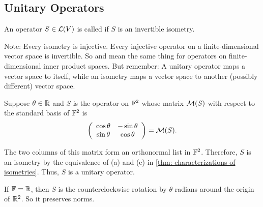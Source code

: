 \subsection{Unitary Operators}

\begin{mydef}
  An operator $S \in \mathcal{L} (V)$ is called  if $S$ is an invertible isometry.
\end{mydef}

Note: Every isometry is injective. Every injective operator on a finite-dimensional vector space is invertible. So  and  mean the same thing for operators on finite-dimensional inner product spaces. But remember: A unitary operator maps a vector space to itself, while an isometry maps a vector space to another (possibly different) vector space.

\begin{example}
  Suppose $\theta \in \mathbb{R}$ and $S$ is the operator on $\mathbb{F}^2$ whose matrix $\mathcal{M}(S)$ with respect to the standard basis of $\mathbb{F}^2$ is
  \[
    \left(\begin{array}{cc}
      \cos \theta & - \sin \theta \\
      \sin \theta & \cos \theta
    \end{array} \right)
    = \mathcal{M}(S).
  \]

  The two columns of this matrix form an orthonormal list in $\mathbb{F}^2$. Therefore, $S$ is an isometry by the equivalence of (a) and (e) in \ref{thm: characterizations of isometries}. Thus, $S$ is a unitary operator.

  If $\mathbb{F}=\mathbb{R}$, then $S$ is the counterclockwise rotation by $\theta$ radians around the origin of $\mathbb{R}^2$. So it preserves norms.
\end{example}

